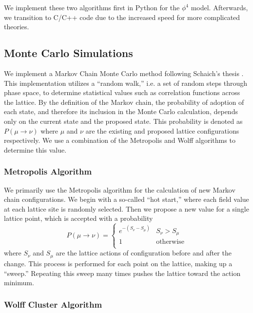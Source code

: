 \documentclass[12pt]{article}
\begin{document}
We implement these two algorithms first in Python for the $\phi^4$ model. Afterwards, we transition to C/C++ code due to the increased speed for more complicated theories. 

\subsection{Monte Carlo Simulations}
\label{sec:mc}

We implement a Markov Chain Monte Carlo method following Schaich's thesis \cite{schaich2006}. This implementation utilizes a ``random walk,'' i.e. a set of random steps through phase space, to determine statistical values such as correlation functions across the lattice. By the definition of the Markov chain, the probability of adoption of each state, and therefore its inclusion in the Monte Carlo calculation, depends only on the current state and the proposed state. This probability is denoted as $P(\mu\rightarrow\nu)$ where $\mu$ and $\nu$ are the existing and proposed lattice configurations respectively. We use a combination of the Metropolis and Wolff algorithms to determine this value.

\subsubsection{Metropolis Algorithm}
We primarily use the Metropolis algorithm for the calculation of new Markov chain configurations. We begin with a so-called ``hot start,'' where each field value at each lattice site is randomly selected. Then we propose a new value for a single lattice point, which is accepted with a probability
\begin{equation}
    P(\mu\rightarrow\nu) = \begin{cases} 
        e^{-(S_\nu - S_\mu)} & S_\nu > S_\mu \\
        1 & \mathrm{otherwise} \\
   \end{cases}
\end{equation}
where $S_\nu$ and $S_\mu$ are the lattice actions of configuration before and after the change. This process is performed for each point on the lattice, making up a ``sweep.'' Repeating this sweep many times pushes the lattice toward the action minimum.

\subsubsection{Wolff Cluster Algorithm}
\end{document}
